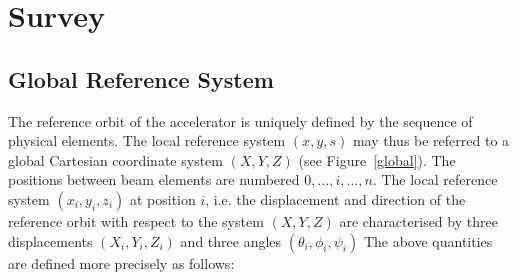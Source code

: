  
 
\chapter{Survey}
\label{survey}
 
\section{Global Reference System}
\label{layout}
The reference orbit of the accelerator is uniquely defined by the
sequence of physical elements.
The local reference system $(x, y, s)$ may thus be referred
to a global Cartesian coordinate system $(X, Y, Z)$
(see Figure~\ref{global}).
The positions between beam elements are numbered $0,\ldots,i,\ldots,n$.
The local reference system $(x_{i}, y_{i}, z_{i})$
at position $i$,
i.e. the displacement and direction of the reference orbit
with respect to the system $(X, Y, Z)$ are characterised by
three displacements $(X_{i}, Y_{i}, Z_{i})$
and three angles $(\theta_{i}, \phi_{i}, \psi_{i})$
The above quantities are defined more precisely as follows:
 

